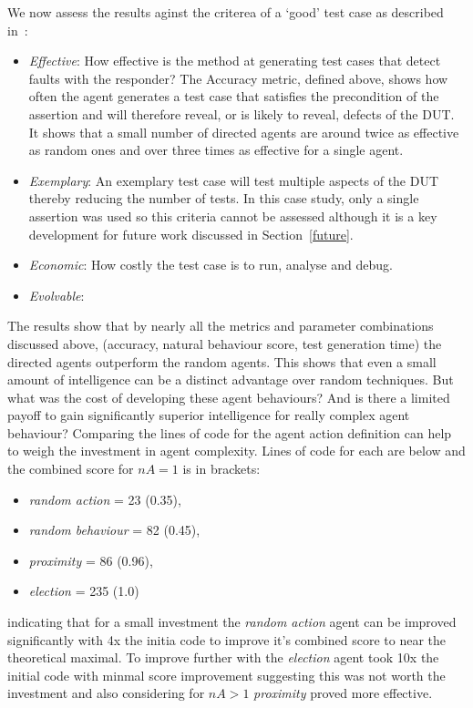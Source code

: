\documentclass[letterpaper, 10 pt, journal, twoside]{IEEEtran}
\begin{document}
We now assess the results aginst the criterea of a `good' test case as described in~\cite{fewster1999software}:
\begin{itemize}
	\item \textit{Effective}: How effective is the method at generating test cases that detect faults with the responder? The Accuracy metric, defined above, shows how often the agent generates a test case that satisfies the precondition of the assertion and will therefore reveal, or is likely to reveal, defects of the DUT. It shows that a small number of directed agents are around twice as effective as random ones and over three times as effective for a single agent.
	\item \textit{Exemplary}: An exemplary test case will test multiple aspects of the DUT thereby reducing the number of tests. In this case study, only a single assertion was used so this criteria cannot be assessed although it is a key development for future work discussed in Section~\ref{future}.
	\item \textit{Economic}: How costly the test case is to run, analyse and debug. 
	\item \textit{Evolvable}:
\end{itemize}


The results show that by nearly all the metrics and parameter combinations discussed above, (accuracy, natural behaviour score, test generation time) the directed agents outperform the random agents. This shows that even a small amount of intelligence can be a distinct advantage over random techniques. 
%
But what was the cost of developing these agent behaviours?
And is there a limited payoff to gain significantly superior intelligence for really complex agent behaviour? %
%
Comparing the lines of code for the agent action definition can help to weigh the investment in agent complexity. Lines of code for each are below and the combined score for $nA=1$ is in brackets:
\begin{itemize}
  \item \textit{random action} = 23 (0.35),
  \item \textit{random behaviour} = 82 (0.45),
  \item \textit{proximity} = 86 (0.96),
  \item \textit{election} = 235 (1.0) 
\end{itemize}
indicating that for a small investment the \textit{random action} agent can be improved significantly with 4x the initia code to improve it's combined score to near the theoretical maximal. To improve further with the \textit{election} agent took 10x the initial code with minmal score improvement suggesting this was not worth the investment and also considering for $nA>1$ \textit{proximity} proved more effective.
\end{document}
